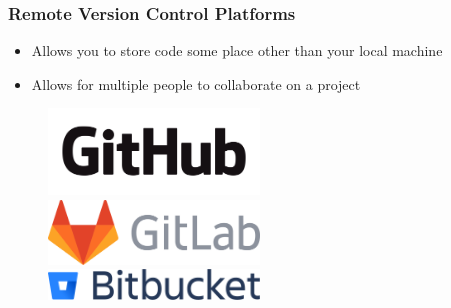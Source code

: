 \documentclass{beamer}
\begin{document}
\begin{frame}
	\frametitle{\textbf{Remote Version Control Platforms}}

	\begin{itemize}
		\item Allows you to store code some place other than your local machine
		\item Allows for multiple people to collaborate on a project 
	\end{itemize}

	\begin{figure}[h]
		\begin{flushleft}
		\includegraphics[width=0.5\textwidth]{img/GitHub_Logo.png} 
		\end{flushleft}
		\centering
		\includegraphics[width=0.5\textwidth]{img/GitLab_logo.png} 
		\begin{flushright}
		\includegraphics[width=0.5\textwidth]{img/Bitbucket_Logo.png} 
		\end{flushright}
	\end{figure}

\end{frame}
\end{document}
